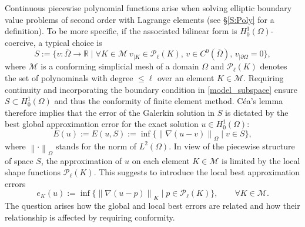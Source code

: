 \documentclass[a4paper]{amsart}
\numberwithin{equation}{section}
\theoremstyle{plain}
\theoremstyle{definition}
\begin{document}
Continuous piecewise polynomial functions arise when solving elliptic boundary 
value problems of second order with Lagrange elements (see \S\ref{S:Poly} for 
a definition).  To be more specific, if the associated bilinear form is 
$H^1_0(\Omega)$-coercive, a typical choice is
\begin{equation}
\label{model_subspace}
 {S}
 {:=}
 \Big\{ v:{\overline{\Omega}}\to{\mathbb{R}} \mid 
  \forall{K}\in{\mathcal{M}}\ v_{|{K}}\in{\mathcal{P}_{{\ell}}({{K}})}, \,
  v\in C^0({\overline{\Omega}}), \, v_{|\partial\Omega}=0
 \Big\},
\end{equation}
where ${\mathcal{M}}$ is a conforming simplicial mesh of a domain $\Omega$ and 
${\mathcal{P}_{{\ell}}({{K}})}$ denotes the set of polynominals with degree $\leq{\ell}$ 
over an element ${K}\in{\mathcal{M}}$.  Requiring continuity and incorporating the 
boundary condition in \eqref{model_subspace} ensure ${S} \subset 
H^1_0(\Omega)$ and thus the conformity of finite element method.
C\'ea's lemma therefore implies that the error of the Galerkin solution in
${S}$ is dictated by the best global approximation error for the
exact solution $u\in H^1_0(\Omega)$:
\begin{equation*}
\label{best-global-error}
 E(u)
 {:=}
 E(u,{S})
 {:=}
 \inf \big\{
  {\left\|{{\nabla}(u-v)}\right\|_{{\Omega}}} \mid v\in{S}
 \big\},
\end{equation*}
where ${\left\|{\cdot}\right\|_{{\Omega}}}$ stands for the norm of $L^2(\Omega)$.  In
view of the piecewise structure of space ${S}$, the approximation of $u$ 
on each element ${K}\in{\mathcal{M}}$ is limited by the local shape functions 
${\mathcal{P}_{{\ell}}({{K}})}$.  This suggests to introduce the local best approximation 
errors
\begin{equation*}
\label{local-best-errors}
 e_{K}(u)
 {:=}
 \inf \big\{
  {\left\|{{\nabla}(u-p)}\right\|_{{K}}} \mid p\in{\mathcal{P}_{{\ell}}({{K}})}
 \big\},
\qquad
 \forall{K}\in{\mathcal{M}}.
\end{equation*}
The question arises how the global and local best errors are related and how 
their relationship is affected by requiring conformity.
\end{document}
